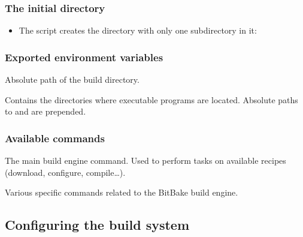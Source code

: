 \begin{frame}
  \frametitle{The initial  directory}
  \begin{itemize}
  \item The  script creates the 
    directory with only one subdirectory in it:
  \end{itemize}
\end{frame}

\begin{frame}
  \frametitle{Exported environment variables}
  \begin{description}[style=nextline]
    \item[BUILDDIR] Absolute path of the build directory.
    \item[PATH] Contains the directories where executable programs are
      located. Absolute paths to  and
       are prepended.
  \end{description}
\end{frame}

\begin{frame}
  \frametitle{Available commands}
  \begin{description}[style=nextline]
    \item[bitbake] The main build engine command. Used to perform
      tasks on available recipes (download, configure, compile\dots).
    \item[bitbake-*] Various specific commands related to the BitBake
      build engine.
  \end{description}
\end{frame}

\subsection{Configuring the build system}

